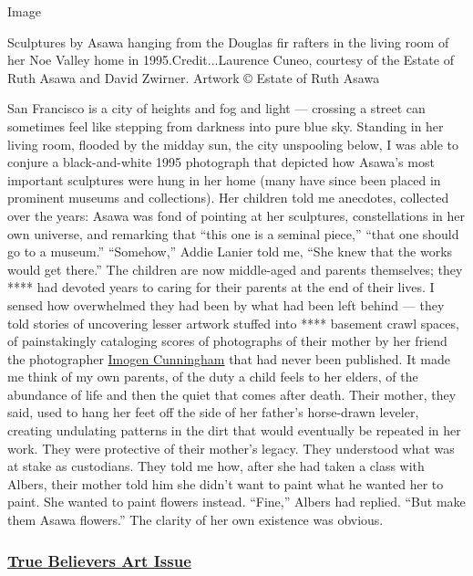 Image

Sculptures by Asawa hanging from the Douglas fir rafters in the living
room of her Noe Valley home in 1995.Credit...Laurence Cuneo, courtesy of
the Estate of Ruth Asawa and David Zwirner. Artwork © Estate of Ruth
Asawa

San Francisco is a city of heights and fog and light --- crossing a
street can sometimes feel like stepping from darkness into pure blue
sky. Standing in her living room, flooded by the midday sun, the city
unspooling below, I was able to conjure a black-and-white 1995
photograph that depicted how Asawa's most important sculptures were hung
in her home (many have since been placed in prominent museums and
collections). Her children told me anecdotes, collected over the years:
Asawa was fond of pointing at her sculptures, constellations in her own
universe, and remarking that ``this one is a seminal piece,'' ``that one
should go to a museum.'' ``Somehow,'' Addie Lanier told me, ``She knew
that the works would get there.'' The children are now middle-aged and
parents themselves; they **** had devoted years to caring for their
parents at the end of their lives. I sensed how overwhelmed they had
been by what had been left behind --- they told stories of uncovering
lesser artwork stuffed into **** basement crawl spaces, of painstakingly
cataloging scores of photographs of their mother by her friend the
photographer
\href{https://www.nytimes.com/1973/05/06/archives/imogen-cunningham-at-ninety-a-remarkable-empathy.html}{Imogen
Cunningham} that had never been published. It made me think of my own
parents, of the duty a child feels to her elders, of the abundance of
life and then the quiet that comes after death. Their mother, they said,
used to hang her feet off the side of her father's horse-drawn leveler,
creating undulating patterns in the dirt that would eventually be
repeated in her work. They were protective of their mother's legacy.
They understood what was at stake as custodians. They told me how, after
she had taken a class with Albers, their mother told him she didn't want
to paint what he wanted her to paint. She wanted to paint flowers
instead. ``Fine,'' Albers had replied. ``But make them Asawa flowers.''
The clarity of her own existence was obvious.

\hypertarget{true-believers-art-issue}{%
\subsubsection{\texorpdfstring{\href{https://www.nytimes.com/issue/t-magazine/2020/07/02/true-believers-art-issue}{True
Believers Art
Issue}}{True Believers Art Issue}}\label{true-believers-art-issue}}

